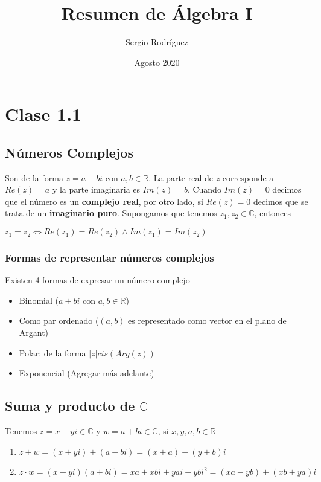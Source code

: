 \documentclass{article}
\title{Resumen de Álgebra I}
\author{Sergio Rodríguez}
\date{Agosto 2020}
\begin{document}
\maketitle

\section{Clase 1.1}
\subsection{Números Complejos}
Son de la forma $z=a+bi$ con $a,b\in \mathbb{R}$. La parte real de $z$ corresponde a $Re(z)=a$ y la parte imaginaria es $Im(z)=b$. Cuando $Im(z)=0$ decimos que el número es un \textbf{complejo real}, por otro lado, si $Re(z)=0$ decimos que se trata de un \textbf{imaginario puro}.
Supongamos que tenemos $z_1,z_2 \in \mathbb{C}$, entonces 
\begin{center}
     $z_1=z_2\Longleftrightarrow Re(z_1)=Re(z_2) \wedge Im(z_1)=Im(z_2)$
\end{center}
\subsubsection{Formas de representar números complejos}
Existen 4 formas de expresar un número complejo
\begin{itemize}
    \item Binomial ($a+bi$ con $a,b\in \mathbb{R}$)
    \item Como par ordenado ($(a,b)$ es representado como vector en el plano de Argant)
    \item Polar; de la forma $|z|cis(Arg(z))$
    \item Exponencial (Agregar más adelante)
\end{itemize}
\subsection{Suma y producto de $\mathbb{C}$}
Tenemos $z=x+yi \in \mathbb{C}$ y $w=a+bi \in \mathbb{C}$, si $x,y,a,b \in \mathbb{R}$
\begin{enumerate}
    \item $z + w = (x + y i) + (a + b i) = (x + a) + (y + b) i$
    \item $z \cdot w = (x + y i)(a + b i) = xa + xb i + ya i + yb i^2 = (xa - yb) + (xb + ya) i$
\end{enumerate}
\end{document}

